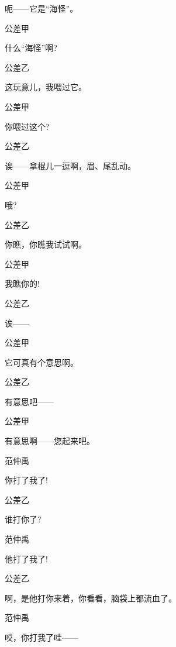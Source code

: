 呃------它是``海怪''。

公差甲\hspace{20pt}~

什么``海怪''啊?

公差乙\hspace{20pt}~

这玩意儿，我喂过它。

公差甲\hspace{20pt}~

你喂过这个?

公差乙\hspace{20pt}~

诶------拿棍儿一逗啊，眉、尾乱动。

公差甲\hspace{20pt}~

哦?

公差乙\hspace{20pt}~

你瞧，你瞧我试试啊。

公差甲\hspace{20pt}~

我瞧你的!

公差乙\hspace{20pt}~

诶------

公差甲\hspace{20pt}~

它可真有个意思啊。

公差乙\hspace{20pt}~

有意思吧------

公差甲\hspace{20pt}~

有意思啊------您起来吧。

范仲禹\hspace{20pt}~

你打了我了!

公差乙\hspace{20pt}~

谁打你了?

范仲禹\hspace{20pt}~

他打了我了!

公差乙\hspace{20pt}~

啊，是他打你来着，你看看，脑袋上都流血了。

范仲禹\hspace{20pt}~

哎，你打我了哇------

